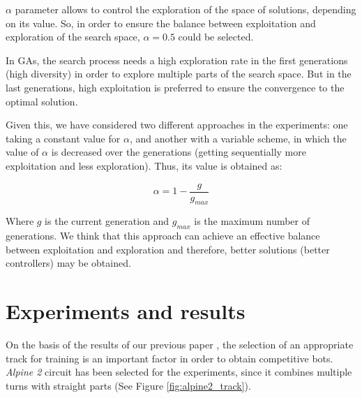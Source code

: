 \documentclass[10pt,journal,compsoc]{IEEEtran}
\begin{document}
$\alpha$ parameter allows to control the exploration of the space of solutions, depending on its value. So, in order to ensure the balance between exploitation and exploration of the search space, $\alpha = 0.5$ could be selected.

In GAs, the search process needs a high exploration rate in the first generations (high diversity) in order to explore multiple parts of the search space. But in the last generations, high exploitation is preferred to ensure the convergence to the optimal solution.

Given this, we have considered two different approaches in the experiments: one taking a constant value for $\alpha$, and another with a variable scheme, in which the value of $\alpha$ is decreased over the generations (getting sequentially more exploitation and less exploration). Thus, its value is obtained as:

 \begin{equation}
 	\label{eqalpha}
 	\alpha =1-\frac{g}{g_{max}}
 \end{equation}

Where $g$ is the current generation and $g_{max}$ is the maximum number of generations. We think that this approach can achieve an effective balance between exploitation and exploration and therefore, better solutions (better controllers) may be obtained.



\section{Experiments and results}  
\label{sec:results}


On the basis of the results of our previous paper \cite{salem_cig2018}, the selection of an appropriate track for training is an important factor in order to obtain competitive bots. \textit{Alpine 2} circuit has been selected for the experiments, since it combines multiple turns with straight parts (See Figure \ref{fig:alpine2_track}).
\end{document}
